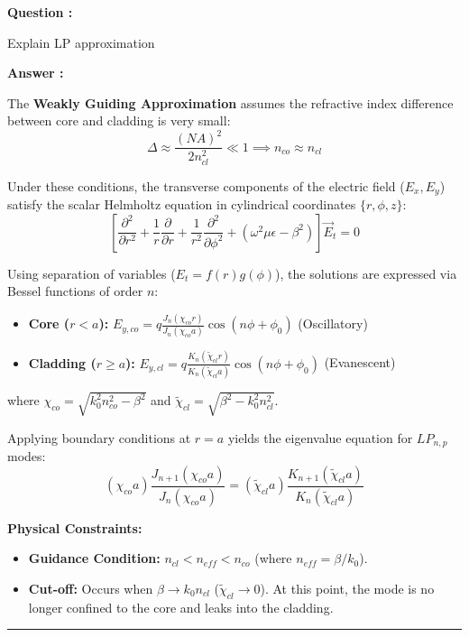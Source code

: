 \documentclass[a4paper,11pt]{book}
\newcounter{qacount}
\newenvironment{question}{
  \refstepcounter{qacount}
  \vspace{1em} %
  \noindent\textbf{Question \theqacount:}\space
}{
  \par %
}
\newenvironment{answer}{
  \noindent\textbf{Answer \theqacount:}\space
}{
  \par\vspace{1em}   %
  \hrule             %
  \vspace{0.5em}     %
}
\begin{document}
\begin{question}
    Explain LP approximation
\end{question}

\begin{answer}

    The \textbf{Weakly Guiding Approximation} assumes the refractive index difference between core and cladding is very small:
    \begin{equation}
        \Delta \approx \frac{(NA)^2}{2n_{cl}^2} \ll 1 \implies n_{co} \approx n_{cl}
    \end{equation}

    Under these conditions, the transverse components of the electric field ($E_x, E_y$) satisfy the scalar Helmholtz equation in cylindrical coordinates $\{r, \phi, z\}$:
    \begin{equation}
        \left[ \frac{\partial^2}{\partial r^2} + \frac{1}{r}\frac{\partial}{\partial r} + \frac{1}{r^2}\frac{\partial^2}{\partial \phi^2} + (\omega^2\mu\epsilon - \beta^2) \right] \vec{E}_t = 0
    \end{equation}

    \noindent Using separation of variables ($E_t = f(r)g(\phi)$), the solutions are expressed via Bessel functions of order $n$:
    \begin{itemize}
        \item \textbf{Core ($r < a$):} $E_{y,co} = q \frac{J_n(\chi_{co}r)}{J_n(\chi_{co}a)} \cos(n\phi + \phi_0)$ (Oscillatory)
        \item \textbf{Cladding ($r \geq a$):} $E_{y,cl} = q \frac{K_n(\tilde{\chi}_{cl}r)}{K_n(\tilde{\chi}_{cl}a)} \cos(n\phi + \phi_0)$ (Evanescent)
    \end{itemize}
    where $\chi_{co} = \sqrt{k_0^2 n_{co}^2 - \beta^2}$ and $\tilde{\chi}_{cl} = \sqrt{\beta^2 - k_0^2 n_{cl}^2}$.

    \noindent Applying boundary conditions at $r=a$ yields the eigenvalue equation for $LP_{n,p}$ modes:
    \begin{equation}
        (\chi_{co} a) \frac{J_{n+1}(\chi_{co}a)}{J_{n}(\chi_{co}a)} = (\tilde{\chi}_{cl} a) \frac{K_{n+1}(\tilde{\chi}_{cl}a)}{K_{n}(\tilde{\chi}_{cl}a)}
    \end{equation}

    \textbf{Physical Constraints:}
    \begin{itemize}
        \item \textbf{Guidance Condition:} $n_{cl} < n_{eff} < n_{co}$ (where $n_{eff} = \beta/k_0$).
        \item \textbf{Cut-off:} Occurs when $\beta \to k_0 n_{cl}$ ($\tilde{\chi}_{cl} \to 0$). At this point, the mode is no longer confined to the core and leaks into the cladding.
    \end{itemize}
\end{answer}
\end{document}
